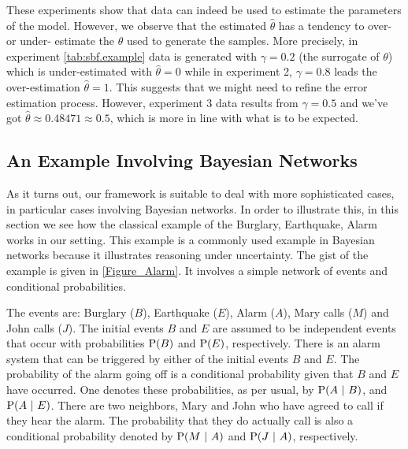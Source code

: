 \documentclass[a4paper, 10pt]{article}
\newcommand{\at}[1]{\ensuremath{\!\del{#1}}}
\newcommand{\pr}[1]{\ensuremath{\mathrm{P}\at{#1}}}
\newcommand{\given}{\ensuremath{~\middle|~}}
\newcommand{\oldnote}[1]{\note{#1}}
\newcounter{remark}
\newcommand{\note}[1]{
    \stepcounter{remark}%
    {\!\!\color{red}/}\footnotemark[\arabic{remark}]\!\!%
    \footnotetext[\arabic{remark}]{{\color{red}/}#1}
}
\begin{document}
These experiments show that data can indeed be used to estimate the parameters of the model. However, we observe that the estimated $\hat{\theta}$ has a tendency to  over- or under- estimate the $\theta$ used to generate the samples. More precisely, in experiment \ref{tab:sbf.example} data is generated with $\gamma = 0.2$ (the surrogate of $\theta$) which is under-estimated with $\hat{\theta} = 0$ while in experiment 2, $\gamma = 0.8$ leads the over-estimation $\hat{\theta} = 1$. This suggests that we might need to refine the error estimation process. However, experiment 3 data results from $\gamma = 0.5$ and we've got $\hat{\theta} \approx 0.48471 \approx 0.5$, which is more in line with what is to be expected.
%
%
%
\subsection{An Example Involving Bayesian Networks}\label{subsec:example.bayesian.networks}
%
%
%
As it turns out, our framework is suitable to deal with more sophisticated cases, in particular cases involving Bayesian networks. In order to illustrate this, in this section we see how the classical example of the Burglary, Earthquake, Alarm \cite{Judea88} works in our setting. This example is a commonly used example in Bayesian networks because it illustrates reasoning under uncertainty.  The gist of the example is given in \cref{Figure_Alarm}. It involves a simple network of events and conditional probabilities.

The events are: Burglary ($B$), Earthquake ($E$), Alarm ($A$), Mary calls ($M$) and John calls ($J$). The initial events $B$ and $E$ are assumed to be independent events that occur with probabilities $\pr{B}$ and $\pr{E}$, respectively. There is an alarm system that can be triggered by either of the initial events $B$ and $E$. The probability of the alarm going off is a conditional probability given that $B$ and $E$ have occurred. One denotes these probabilities, as per usual,  by $\pr{A \given B}$, and $\pr{A \given E}$. There are two neighbors, Mary and John who have agreed to call if they hear the alarm. The probability that they do actually call is also a conditional probability denoted by $\pr{M \given A}$ and $\pr{J \given A}$, respectively.
\end{document}
